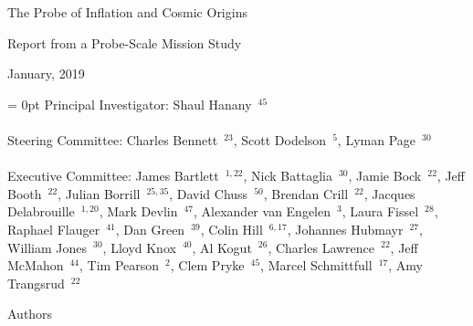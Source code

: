 \documentclass[PICOReport.tex]{subfiles}
\begin{document}
%
%
%
%
\LARGE{ \centerline{The Probe of Inflation and Cosmic Origins}}
\vspace{0.08in}
\Large{ \centerline{Report from a Probe-Scale Mission Study}}
\large{ \centerline{January, 2019 }}
\vspace{3pt} 

\parindent = 0pt
\small{
Principal Investigator: Shaul Hanany~$^{45}$ } \\
\vspace{-7pt} \\
\small{
Steering Committee: Charles Bennett~$^{23}$, Scott Dodelson~$^{5}$, Lyman Page~$^{30}$ } \\
\vspace{-7pt} \\
\small{
Executive Committee: 
James Bartlett~$^{1,22}$,
Nick Battaglia~$^{30}$,
Jamie Bock~$^{22}$, 
Jeff Booth~$^{22}$,
Julian Borrill~$^{25,35}$, 
David Chuss~$^{50}$,
Brendan Crill~$^{22}$, 
Jacques Delabrouille~$^{1,20}$,
Mark Devlin~$^{47}$, 
Alexander van Engelen~$^3$,
Laura Fissel~$^{28}$,
Raphael Flauger~$^{41}$, 
Dan Green~$^{39}$,
Colin Hill~$^{6,17}$,
Johannes Hubmayr~$^{27}$,
William Jones~$^{30}$, 
Lloyd Knox~$^{40}$, 
Al Kogut~$^{26}$, 
Charles Lawrence~$^{22}$, 
Jeff McMahon~$^{44}$, 
Tim Pearson~$^{2}$,
Clem Pryke~$^{45}$, 
Marcel Schmittfull~$^{17}$,
Amy Trangsrud~$^{22}$ \\
}

\label{authorlist}

\Large  {\centerline {Authors}}
\end{document}
